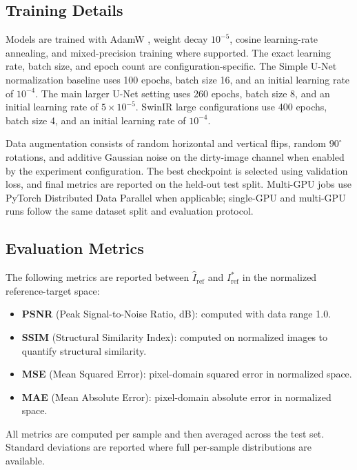 \documentclass[twocolumn]{aastex631}
\begin{document}
\subsection{Training Details}

Models are trained with AdamW \citep{Loshchilov2019}, weight decay $10^{-5}$, cosine learning-rate annealing, and mixed-precision training where supported.
The exact learning rate, batch size, and epoch count are configuration-specific.
The Simple U-Net normalization baseline uses 100 epochs, batch size 16, and an initial learning rate of $10^{-4}$.
The main larger U-Net setting uses 260 epochs, batch size 8, and an initial learning rate of $5\times10^{-5}$.
SwinIR large configurations use 400 epochs, batch size 4, and an initial learning rate of $10^{-4}$.

Data augmentation consists of random horizontal and vertical flips, random $90^\circ$ rotations, and additive Gaussian noise on the dirty-image channel when enabled by the experiment configuration.
The best checkpoint is selected using validation loss, and final metrics are reported on the held-out test split.
Multi-GPU jobs use PyTorch Distributed Data Parallel when applicable; single-GPU and multi-GPU runs follow the same dataset split and evaluation protocol.

\subsection{Evaluation Metrics}

The following metrics are reported between $\hat{I}_{\mathrm{ref}}$ and $I_{\mathrm{ref}}^*$ in the normalized reference-target space:
\begin{itemize}
	\item \textbf{PSNR} (Peak Signal-to-Noise Ratio, dB): computed with data range 1.0.
	\item \textbf{SSIM} (Structural Similarity Index): computed on normalized images to quantify structural similarity.
	\item \textbf{MSE} (Mean Squared Error): pixel-domain squared error in normalized space.
	\item \textbf{MAE} (Mean Absolute Error): pixel-domain absolute error in normalized space.
\end{itemize}

All metrics are computed per sample and then averaged across the test set.
Standard deviations are reported where full per-sample distributions are available.
\end{document}
